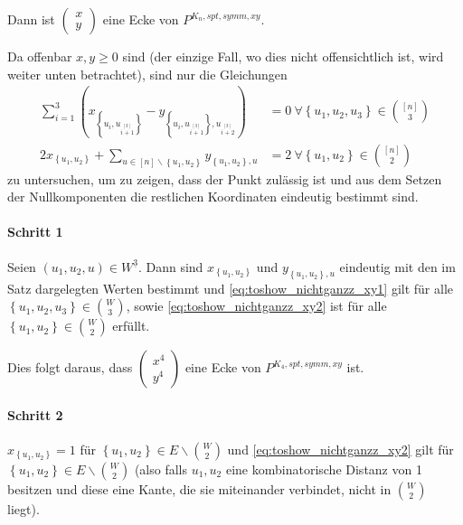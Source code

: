 \documentclass[10p,a4paper,BCOR = 12mm, DIV=15]{scrbook}
\begin{document}
{\begin{Sa}
Dann ist $\left(
\begin{array}{c}
x \\
y
\end{array}\right)$ eine Ecke von $P^{K_n, spt, symm, xy}$.
\end{Sa}
\begin{bew}
Da offenbar $x, y \geq 0$ sind (der einzige Fall, wo dies nicht offensichtlich ist, wird weiter unten betrachtet), sind nur die Gleichungen 
\begin{align}
\sum_{i=1}^3 \left(x_{\left\{u_{i}, u_{i \stackrel{\left[3\right]}{+} 1}\right\}} -  y_{\left\{u_{i}, u_{i \stackrel{\left[3\right]}{+} 1}\right\}, u_{i \stackrel{\left[3\right]}{+} 2}}\right) & = 0\ \forall \left\{u_1, u_2, u_3\right\}\in {[n] \choose 3} \label{eq:toshow_nichtganzz_xy1} \\
2 x_{\left\{u_1, u_2\right\}} + \sum_{u\in[n]\backslash\left\{u_1, u_2\right\}} y_{\left\{u_1, u_2\right\}, u} & = 2\ \forall \left\{u_1, u_2\right\}\in {[n] \choose 2} \label{eq:toshow_nichtganzz_xy2}
\end{align}
zu untersuchen, um zu zeigen, dass der Punkt zulässig ist und aus dem Setzen der Nullkomponenten die restlichen Koordinaten eindeutig bestimmt sind.

\paragraph{Schritt 1}
Seien $\left(u_1, u_2, u\right) \in W^{\underline{3}}$. Dann sind  $x_{\left\{u_1, u_2\right\}}$ und $y_{\left\{u_1, u_2\right\}, u}$ eindeutig mit den im Satz dargelegten Werten bestimmt und \eqref{eq:toshow_nichtganzz_xy1} gilt für alle $\left\{u_1, u_2, u_3\right\}\in {W \choose 3}$, sowie \eqref{eq:toshow_nichtganzz_xy2} ist für alle $\left\{u_1, u_2\right\}\in {W \choose 2}$ erfüllt.

Dies folgt daraus, dass $\left(
\begin{array}{c}
x^{4} \\
y^{4}
\end{array}
\right)$ eine Ecke von $P^{K_4, spt, symm, xy}$ ist.

\paragraph{Schritt 2}
$x_{\left\{u_1, u_2\right\}} = 1$ für $\left\{u_1, u_2\right\} \in E \backslash {W \choose 2}$ und \eqref{eq:toshow_nichtganzz_xy2} gilt für $\left\{u_1, u_2\right\} \in E \backslash {W \choose 2}$ (also falls $u_1, u_2$ eine kombinatorische Distanz von 1 besitzen und diese eine Kante, die sie miteinander verbindet, nicht in $W \choose 2$ liegt).


\end{bew}}
\end{document}
